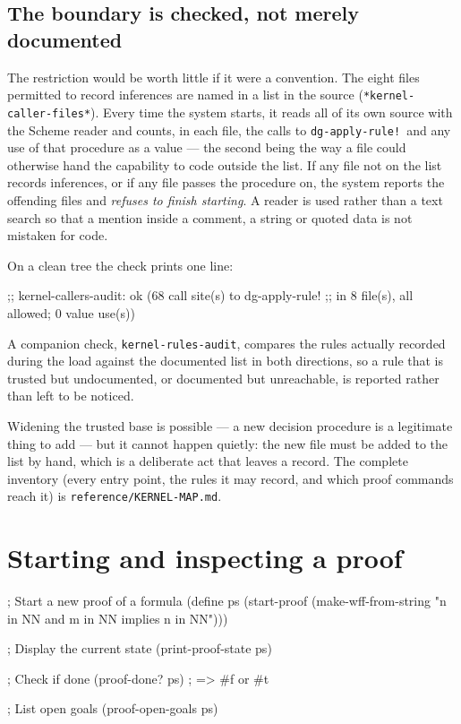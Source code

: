 \subsection{The boundary is checked, not merely documented}

The restriction would be worth little if it were a convention.  The eight
files permitted to record inferences are named in a list in the source
(\texttt{*kernel-caller-files*}).  Every time the system starts, it reads
all of its own source with the Scheme reader and counts, in each file,
the calls to \texttt{dg-apply-rule!}\ and any use of that procedure as a
value --- the second being the way a file could otherwise hand the
capability to code outside the list.  If any file not on the list records
inferences, or if any file passes the procedure on, the system reports
the offending files and \emph{refuses to finish starting}.  A reader is
used rather than a text search so that a mention inside a comment, a
string or quoted data is not mistaken for code.

On a clean tree the check prints one line:

\begin{VNBcode}
;; kernel-callers-audit: ok (68 call site(s) to dg-apply-rule!
;;   in 8 file(s), all allowed; 0 value use(s))
\end{VNBcode}

A companion check, \texttt{kernel-rules-audit}, compares the rules
actually recorded during the load against the documented list in both
directions, so a rule that is trusted but undocumented, or documented but
unreachable, is reported rather than left to be noticed.

Widening the trusted base is possible --- a new decision procedure is a
legitimate thing to add --- but it cannot happen quietly: the new file
must be added to the list by hand, which is a deliberate act that leaves
a record.  The complete inventory (every entry point, the rules it may
record, and which proof commands reach it) is
\texttt{reference/KERNEL-MAP.md}.

\section{Starting and inspecting a proof}

\begin{VNBcode}
; Start a new proof of a formula
(define ps (start-proof (make-wff-from-string
  "n in NN and m in NN implies n in NN")))

; Display the current state
(print-proof-state ps)

; Check if done
(proof-done? ps)   ; => #f or #t

; List open goals
(proof-open-goals ps)
\end{VNBcode}

